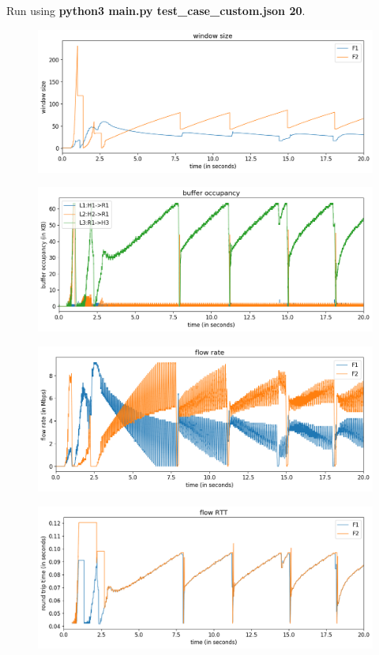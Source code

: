 \documentclass{article}
\begin{document}
Run using \textbf{python3 main.py test\_case\_custom.json 20}.

\begin{figure}[H]
\centering
\includegraphics[width = \textwidth]{test_case_custom window size.png}
\end{figure}

\begin{figure}[H]
\centering
\includegraphics[width = \textwidth]{test_case_custom buffer occupancy.png}
\end{figure}

\begin{figure}[H]
\centering
\includegraphics[width = \textwidth]{test_case_custom flow rate.png}
\end{figure}

\begin{figure}[H]
\centering
\includegraphics[width = \textwidth]{test_case_custom flow RTT.png}
\end{figure}
\end{document}
